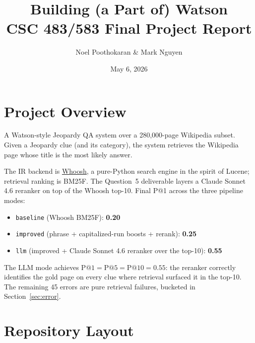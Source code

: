 \documentclass[11pt]{article}
\title{\textbf{Building (a Part of) Watson}\\[0.5em]
       \large CSC 483/583 Final Project Report}
\author{Noel Poothokaran \& Mark Nguyen}
\date{May 6, 2026}
\begin{document}
\maketitle
\tableofcontents
\newpage

\section{Project Overview}

A Watson-style Jeopardy QA system over a 280,000-page Wikipedia subset.
Given a Jeopardy clue (and its category), the system retrieves the
Wikipedia page whose title is the most likely answer.

The IR backend is \href{https://whoosh.readthedocs.io/}{Whoosh}, a
pure-Python search engine in the spirit of Lucene; retrieval ranking is
BM25F. The Question~5 deliverable layers a Claude Sonnet 4.6 reranker
on top of the Whoosh top-10. Final P@1 across the three pipeline modes:

\begin{itemize}
  \item \texttt{baseline} (Whoosh BM25F): \textbf{0.20}
  \item \texttt{improved} (phrase + capitalized-run boosts + rerank):
        \textbf{0.25}
  \item \texttt{llm} (improved + Claude Sonnet 4.6 reranker over the
        top-10): \textbf{0.55}
\end{itemize}

The LLM mode achieves $\text{P@1} = \text{P@5} = \text{P@10} = 0.55$:
the reranker correctly identifies the gold page on every clue where
retrieval surfaced it in the top-10. The remaining 45 errors are pure
retrieval failures, bucketed in Section~\ref{sec:error}.

\section{Repository Layout}
\end{document}
